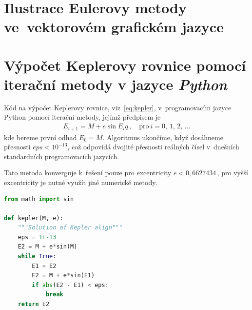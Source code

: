 \documentclass[A4paper, 12pt, oneside]{book}
\begin{document}
\printbibliography
\begin{appendices}
	\chapter{Ilustrace Eulerovy metody ve~vektorovém grafickém jazyce } \label{app:asy}

	\begin{figure}[!htb]
	\centering
	\end{figure}

	

	\chapter{Výpočet Keplerovy rovnice pomocí iterační metody v jazyce \textit{Python}} \label{app:kepit}
	Kód na výpočet Keplerovy rovnice, viz~\eqref{eq:kepler}, v~programovacím jazyce Python pomocí iterační metody, jejímž předpisem je
	\begin{align*}
		E_{i+1}=M+e\sin{E_i}q\,, \quad \text{pro}\ i=0,\,1,\,2,\,\ldots
	\end{align*}
	kde bereme první odhad $E_0=M$. Algoritmus ukončíme, když dosáhneme přesnosti ${eps<10^{-13}}$, což odpovídá dvojité přesnosti reálných čísel v~dnešních standardních programovacích jazycích.

	Tato metoda konverguje k~řešení pouze pro excentricity $e<0,6627434\,$, pro vyšší excentricity je nutné využít jiné numerické metody.
\begin{lstlisting}[language=Python]
from math import sin

def kepler(M, e):
    """Solution of Kepler align"""
    eps = 1E-13
    E2 = M + e*sin(M)
    while True:
        E1 = E2
        E2 = M + e*sin(E1)
        if abs(E2 - E1) < eps:
            break 
    return E2
\end{lstlisting}

\end{appendices}
\end{document}
